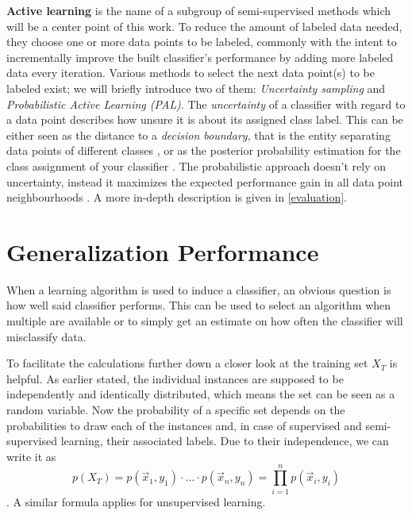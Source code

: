 \textbf{Active learning} is the name of a subgroup of semi-supervised methods which will be a center point of this work. To reduce the amount of labeled data needed, they choose one or more data points to be labeled, commonly with the intent to incrementally improve the built classifier's performance by adding more labeled data every iteration. Various methods to select the next data point(s) to be labeled exist; we will briefly introduce two of them: \textit{Uncertainty sampling} and \textit{Probabilistic Active Learning (PAL)}. The \textit{uncertainty} of a classifier with regard to a data point describes how unsure it is about its assigned class label. This can be either seen as the distance to a \textit{decision boundary}, that is the entity separating data points of different classes \cite{SchefferEtAl2001}, or as the posterior probability estimation for the class assignment of your classifier \cite{ZhuEtAl2008}. The probabilistic approach doesn't rely on uncertainty, instead it maximizes the expected performance gain in all data point neighbourhoods \cite{KremplEtAl2014}. A more in-depth description is given in \ref{evaluation}.

\section{Generalization Performance}
When a learning algorithm is used to induce a classifier, an obvious question is how well said classifier performs. This can be used to select an algorithm when multiple are available or to simply get an estimate on how often the classifier will misclassify data.

To facilitate the calculations further down a closer look at the training set $X_T$ is helpful. As earlier stated, the individual instances are supposed to be independently and identically distributed, which means the set can be seen as a random variable. Now the probability of a specific set depends on the probabilities to draw each of the instances and, in case of supervised and semi-supervised learning, their associated labels. Due to their independence, we can write it as 
\begin{equation}
p(X_T) = p(\vec{x}_1, y_1) \cdot ... \cdot p(\vec{x}_n, y_n) = \prod_{i=1}^{n} p(\vec{x}_i, y_i)
\end{equation}
\cite{RodriguezEtAl2013}. A similar formula applies for unsupervised learning.

